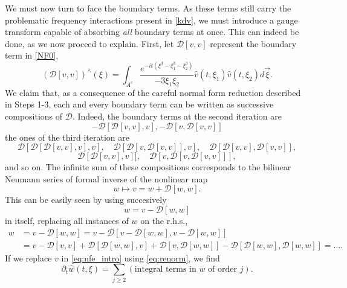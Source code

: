 \documentclass[%
11pt,  reqno]{amsart}
\newcommand{\5}{\textup{V}}
\newcommand{\dt}{\partial_t}
\theoremstyle{remark}
\newcommand{\R}{\mathbb{R}}
\numberwithin{equation}{section}
\numberwithin{theorem}{section}
\begin{document}
We must now turn to face the boundary terms. As these terms still carry the problematic frequency interactions present in \eqref{kdv}, we must introduce a gauge transform
    capable of absorbing \emph{all} boundary terms at once. This can indeed be done, as we now proceed to explain. First, let $\mathcal{D}[v,v]$ represent the  boundary term  in \eqref{NF0},
	$$
	(\mathcal{D}[v,v])^\wedge(\xi) =  \int_{A^c}\frac{e^{-it (\xi^3 -
			\xi_1^3 - \xi_2^3) }}{-3\xi_1\xi_2}  \widehat{v}(t, \xi_1) \widehat{v}(t,\xi_2) d\vec{\xi}.
	$$
	We claim that, as a consequence of the careful normal form reduction described in Steps 1-3, each and every boundary term can be written as successive compositions of $\mathcal{D}$. Indeed, the boundary terms at the second iteration are
	$$
	-\mathcal{D}[\mathcal{D}[v,v],v], -\mathcal{D}[v,\mathcal{D}[v,v]]
	$$
	the ones of the third iteration are
	$$
	\mathcal{D}[\mathcal{D}[\mathcal{D}[v,v],v],v],\quad \mathcal{D}[\mathcal{D}[v,\mathcal{D}[v,v]],v],\quad \mathcal{D}[\mathcal{D}[v,v],\mathcal{D}[v,v]],$$
	$$\mathcal{D}[\mathcal{D}[v,v],v]],\quad \mathcal{D}[v,\mathcal{D}[v,\mathcal{D}[v,v]]],
	$$
	and so on. The infinite sum of these compositions corresponds to the bilinear Neumann series of formal inverse of the nonlinear map
\begin{equation}\label{eq:renorm}
		w\mapsto v=w+\mathcal{D}[w,w].
	\end{equation}
    This can be easily seen  by using succesively 
	$$
	w=v-\mathcal{D}[w,w]
	$$
	in itself, replacing all instances of $w$ on the r.h.s.,
	\begin{align}
		w&=v-\mathcal{D}[w,w]=v-\mathcal{D}[v-\mathcal{D}[w,w],v-\mathcal{D}[w,w]]\\&=v-\mathcal{D}[v,v]+\mathcal{D}[\mathcal{D}[w,w],v]+\mathcal{D}[v,\mathcal{D}[w,w]]-\mathcal{D}[\mathcal{D}[w,w],\mathcal{D}[w,w]]=\dots.
	\end{align}
	If we replace $v$ in \eqref{eq:nfe_intro} using \eqref{eq:renorm}, we find
	\begin{equation}\label{eq:nfe_intro2}
		\dt \widehat{w}(t,\xi)= \sum_{j\ge 2} (\mbox{integral terms in }w\mbox{ of order }j).
	\end{equation}
\end{document}
